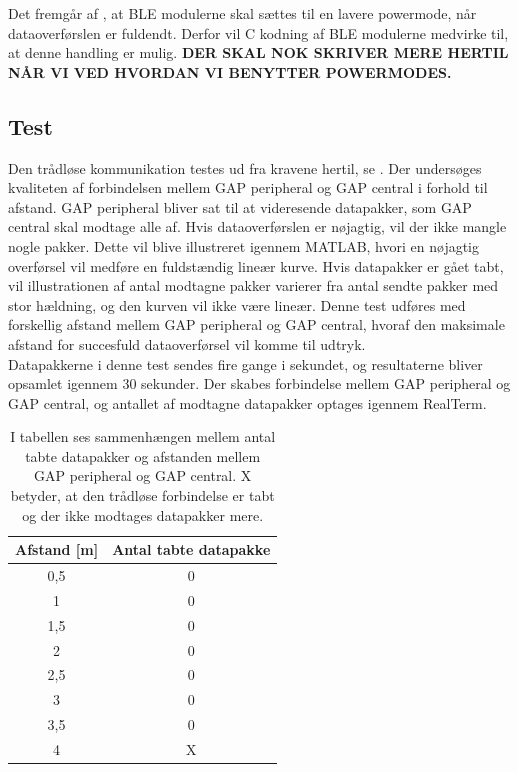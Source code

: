 Det fremgår af , at BLE modulerne skal sættes til en lavere powermode, når dataoverførslen er fuldendt. Derfor vil C kodning af BLE modulerne medvirke til, at denne handling er mulig. \textbf{DER SKAL NOK SKRIVER MERE HERTIL NÅR VI VED HVORDAN VI BENYTTER POWERMODES.}

\subsection{Test}
Den trådløse kommunikation testes ud fra kravene hertil, se . Der undersøges kvaliteten af forbindelsen mellem GAP peripheral og GAP central i forhold til afstand. GAP peripheral bliver sat til at videresende datapakker, som GAP central skal modtage alle af. Hvis dataoverførslen er nøjagtig, vil der ikke mangle nogle pakker. Dette vil blive illustreret igennem MATLAB, hvori en nøjagtig overførsel vil medføre en fuldstændig lineær kurve. Hvis datapakker er gået tabt, vil illustrationen af antal modtagne pakker varierer fra antal sendte pakker med stor hældning, og den kurven vil ikke være lineær. Denne test udføres med forskellig afstand mellem GAP peripheral og GAP central, hvoraf den maksimale afstand for succesfuld dataoverførsel vil komme til udtryk. \\
Datapakkerne i denne test sendes fire gange i sekundet, og resultaterne bliver opsamlet igennem 30 sekunder. Der skabes forbindelse mellem GAP peripheral og GAP central, og antallet af modtagne datapakker optages igennem RealTerm.
\begin{table}[H]
	\centering
	\begin{tabular}{cc}
			\hline
		\rowcolor[HTML]{C0C0C0} 
		Afstand {[}m{]} & Antal tabte datapakke \\ 	\hline
		0,5 & 0 \\ 	\hline
		1 & 0 \\	\hline
		1,5 & 0 \\	\hline
		2 & 0 \\	\hline
		2,5 & 0 \\	\hline
		3 & 0 \\	\hline
		3,5 & 0 \\	\hline
		4 & X \\	\hline
	\end{tabular}
	\caption{I tabellen ses sammenhængen mellem antal tabte datapakker og afstanden mellem GAP peripheral og GAP central. X betyder, at den trådløse forbindelse er tabt og der ikke modtages datapakker mere.}
	\label{test:ble_overforsel}
\end{table} \vspace{-.5cm}
